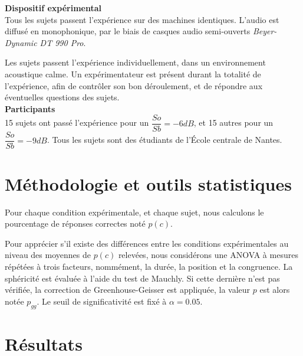 {\setlength{\parindent}{0cm}\textbf{Dispositif expérimental}} \\

Tous les sujets passent l'expérience sur des machines identiques. L'audio est diffusé en monophonique, par le biais de casques audio semi-ouverts \emph{Beyer-Dynamic DT 990 Pro}. 

Les sujets passent l'expérience individuellement, dans un environnement acoustique calme. Un expérimentateur est présent durant la totalité de l'expérience, afin de contrôler son bon déroulement, et de répondre aux éventuelles questions des sujets. \\

{\setlength{\parindent}{0cm}\textbf{Participants}} \\

15 sujets ont passé l'expérience pour un $\dfrac{So}{Sb}=-6dB$, et 15 autres pour un $\dfrac{So}{Sb}=-9dB$. Tous les sujets sont des étudiants de l'École centrale de Nantes.

\section{Méthodologie et outils statistiques}

Pour chaque condition expérimentale, et chaque sujet, nous calculons le pourcentage de réponses correctes noté $p(c)$.

Pour apprécier s'il existe des différences entre les conditions expérimentales au niveau des moyennes de $p(c)$ relevées, nous considérons une ANOVA à mesures répétées à trois facteurs, nommément, la durée, la position et la congruence. La sphéricité est évaluée à l'aide du test de Mauchly. Si cette dernière n'est pas vérifiée, la correction de Greenhouse-Geisser est appliquée, la valeur $p$ est alors notée $p_{gg}$. Le seuil de significativité est fixé à $\alpha=0.05$.

\section{Résultats}

